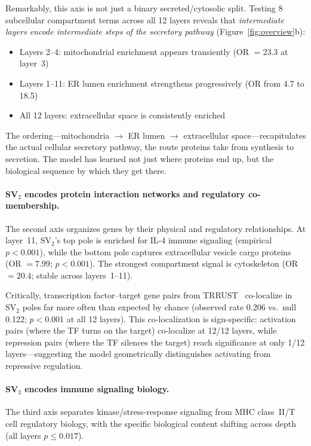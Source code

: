 \documentclass[10pt,twocolumn]{article}
\newcommand{\SV}[1]{\mathrm{SV}_{#1}}
\begin{document}
Remarkably, this axis is not just a binary secreted/cytosolic split.
Testing 8 subcellular compartment terms across all 12 layers reveals that \emph{intermediate layers encode intermediate steps of the secretory pathway} (Figure~\ref{fig:overview}b):
\begin{itemize}
  \item Layers 2--4: mitochondrial enrichment appears transiently (OR $= 23.3$ at layer~3)
  \item Layers 1--11: ER lumen enrichment strengthens progressively (OR from 4.7 to 18.5)
  \item All 12 layers: extracellular space is consistently enriched
\end{itemize}
The ordering---mitochondria $\to$ ER lumen $\to$ extracellular space---recapitulates the actual cellular secretory pathway, the route proteins take from synthesis to secretion.
The model has learned not just where proteins end up, but the biological sequence by which they get there.

\paragraph{SV$_2$ encodes protein interaction networks and regulatory co-membership.}
The second axis organizes genes by their physical and regulatory relationships.
At layer~11, $\SV{2}$'s top pole is enriched for IL-4 immune signaling (empirical $p < 0.001$), while the bottom pole captures extracellular vesicle cargo proteins (OR $= 7.99$; $p < 0.001$).
The strongest compartment signal is cytoskeleton (OR $= 20.4$; stable across layers~1--11).

Critically, transcription factor--target gene pairs from TRRUST~\citep{han2018trrust} co-localize in $\SV{2}$ poles far more often than expected by chance (observed rate 0.206 vs.\ null 0.122; $p < 0.001$ at all 12 layers).
This co-localization is sign-specific: activation pairs (where the TF turns on the target) co-localize at 12/12 layers, while repression pairs (where the TF silences the target) reach significance at only 1/12 layers---suggesting the model geometrically distinguishes activating from repressive regulation.

\paragraph{SV$_3$ encodes immune signaling biology.}
The third axis separates kinase/stress-response signaling from MHC class~II/T cell regulatory biology, with the specific biological content shifting across depth (all layers $p \leq 0.017$).
\end{document}
